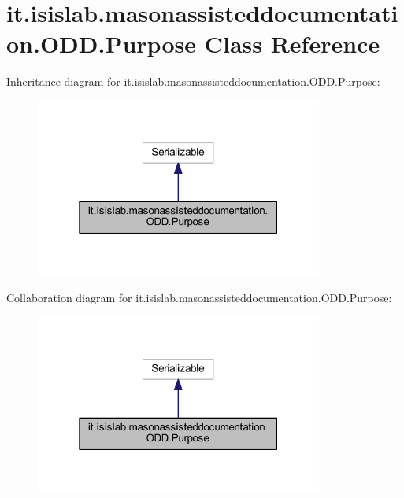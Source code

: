 \hypertarget{classit_1_1isislab_1_1masonassisteddocumentation_1_1_o_d_d_1_1_purpose}{\section{it.\-isislab.\-masonassisteddocumentation.\-O\-D\-D.\-Purpose Class Reference}
\label{classit_1_1isislab_1_1masonassisteddocumentation_1_1_o_d_d_1_1_purpose}
}


Inheritance diagram for it.\-isislab.\-masonassisteddocumentation.\-O\-D\-D.\-Purpose\-:
\nopagebreak
\begin{figure}[H]
\begin{center}
\leavevmode
\includegraphics[width=268pt]{classit_1_1isislab_1_1masonassisteddocumentation_1_1_o_d_d_1_1_purpose__inherit__graph}
\end{center}
\end{figure}


Collaboration diagram for it.\-isislab.\-masonassisteddocumentation.\-O\-D\-D.\-Purpose\-:
\nopagebreak
\begin{figure}[H]
\begin{center}
\leavevmode
\includegraphics[width=268pt]{classit_1_1isislab_1_1masonassisteddocumentation_1_1_o_d_d_1_1_purpose__coll__graph}
\end{center}
\end{figure}
